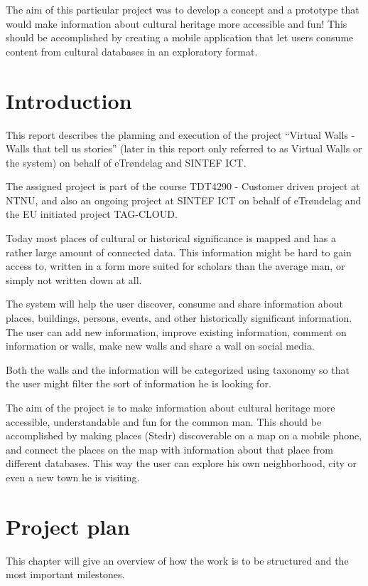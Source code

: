 \documentclass[11pt]{book}
\begin{document}
The aim of this particular project was to develop a concept and a prototype that would make information about cultural heritage more accessible and fun! This should be accomplished by creating a mobile application that let users consume content from cultural databases in an exploratory format.


\tableofcontents
\listoffigures
\listoftables

\mainmatter
\chapter{Introduction}
This report describes the planning and execution of the project ``Virtual Walls - Walls that tell us stories'' (later in this report only referred to as Virtual Walls or the system) on behalf of eTrøndelag and SINTEF ICT.

The assigned project is part of the course TDT4290 - Customer driven project at NTNU, and also an ongoing project at SINTEF ICT on behalf of eTrøndelag and the EU initiated project TAG-CLOUD.

Today most places of cultural or historical significance is mapped and has a rather large amount of connected data. This information might be hard to gain access to, written in a form more suited for scholars than the average man, or simply not written down at all.

The system will help the user discover, consume and share information about places, buildings, persons, events, and other historically significant information. The user can add new information, improve existing information, comment on information or walls, make new walls and share a wall on social media.

Both the walls and the information will be categorized using taxonomy so that the user might filter the sort of information he is looking for.

The aim of the project is to make information about cultural heritage more accessible, understandable and fun for the common man. This should be accomplished by making places (Stedr) discoverable on a map on a mobile phone, and connect the places on the map with information about that place from different databases. This way the user can explore his own neighborhood, city or even a new town he is visiting.

\chapter{Project plan}
This chapter will give an overview of how the work is to be structured and the most important milestones.
\end{document}
